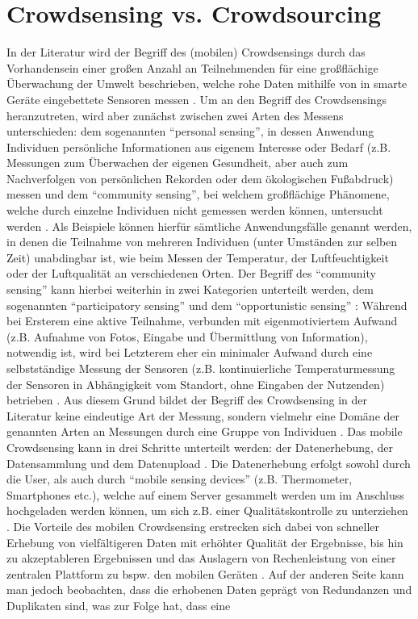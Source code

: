 \section{Crowdsensing vs. Crowdsourcing}
\label{sec:crowdsensing}
In der Literatur wird der Begriff des (mobilen) Crowdsensings durch das Vorhandensein einer großen Anzahl an Teilnehmenden für eine großflächige Überwachung der Umwelt beschrieben, welche rohe Daten mithilfe von in smarte Geräte eingebettete Sensoren messen \cite{Ray2022}. Um an den Begriff des Crowdsensings heranzutreten, wird aber zunächst zwischen zwei Arten des Messens unterschieden: dem sogenannten \enquote{personal sensing}, in dessen Anwendung Individuen persönliche Informationen aus eigenem Interesse oder Bedarf (z.B. Messungen zum Überwachen der eigenen Gesundheit, aber auch zum Nachverfolgen von persönlichen Rekorden oder dem ökologischen Fußabdruck) messen und dem \enquote{community sensing}, bei welchem großflächige Phänomene, welche durch einzelne Individuen nicht gemessen werden können, untersucht werden \cite{Ganti2011}. \newline Als Beispiele können hierfür sämtliche Anwendungsfälle genannt werden, in denen die Teilnahme von mehreren Individuen (unter Umständen zur selben Zeit) unabdingbar ist, wie beim Messen der Temperatur, der Luftfeuchtigkeit oder der Luftqualität an verschiedenen Orten. Der Begriff des \enquote{community sensing} kann hierbei weiterhin in zwei Kategorien unterteilt werden, dem sogenannten \enquote{participatory sensing} \cite{Burke2006} und dem \enquote{opportunistic sensing} \cite{Lane2010}: \newline Während bei Ersterem eine aktive Teilnahme, verbunden mit eigenmotiviertem Aufwand (z.B. Aufnahme von Fotos, Eingabe und Übermittlung von Information), notwendig ist, wird bei Letzterem eher ein minimaler Aufwand durch eine selbstständige Messung der Sensoren (z.B. kontinuierliche Temperaturmessung der Sensoren in Abhängigkeit vom Standort, ohne Eingaben der Nutzenden) betrieben \cite{Ganti2011}. Aus diesem Grund bildet der Begriff des Crowdsensing in der Literatur keine eindeutige Art der Messung, sondern vielmehr eine Domäne der genannten Arten an Messungen durch eine Gruppe von Individuen \cite{Ganti2011}. \newline Das mobile Crowdsensing kann in drei Schritte unterteilt werden: der Datenerhebung, der Datensammlung und dem Datenupload \cite{Ray2022}. Die Datenerhebung erfolgt sowohl durch die User, als auch durch \enquote{mobile sensing devices} (z.B. Thermometer, Smartphones etc.), welche auf einem Server gesammelt werden um im Anschluss hochgeladen werden können, um sich z.B. einer Qualitätskontrolle zu unterziehen \cite{Ray2022}. Die Vorteile des mobilen Crowdsensing erstrecken sich dabei von schneller Erhebung von vielfältigeren Daten mit erhöhter Qualität der Ergebnisse, bis hin zu akzeptableren Ergebnissen und das Auslagern von Rechenleistung von einer zentralen Plattform zu bspw. den mobilen Geräten \cite{Ray2022}. Auf der anderen Seite kann man jedoch beobachten, dass die erhobenen Daten geprägt von Redundanzen und Duplikaten sind, was zur Folge hat, dass eine 
